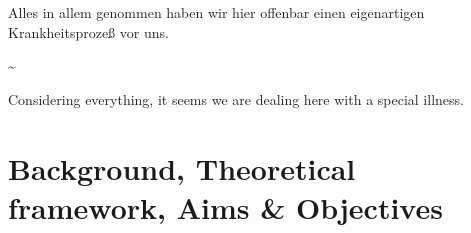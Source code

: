 \documentclass[a4paper, twoside]{templates/ociamthesis}
\begin{document}
\begin{romanpages}
\flushbottom

\tableofcontents

\listoffigures
	\mtcaddchapter

\listoftables
  \mtcaddchapter


\end{romanpages}

\raggedbottom

\begin{savequote}
Alles in allem genommen haben wir hier offenbar einen eigenartigen
Krankheitsprozeß vor uns.

\textasciitilde{}

Considering everything, it seems we are dealing here with a special
illness.
\end{savequote}



\hypertarget{background-heading}{%
\chapter{Background, Theoretical framework, Aims \& Objectives}\label{background-heading}}

~

\minitoc 

\newpage
\end{document}
